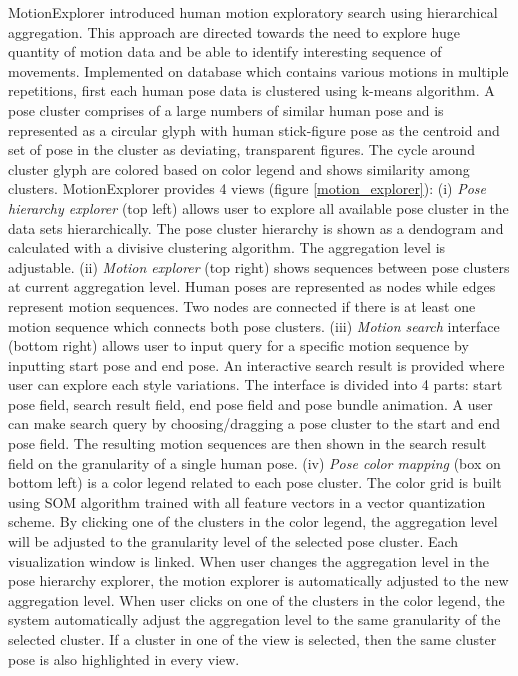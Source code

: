 MotionExplorer\cite{bernard2013} introduced human motion exploratory search using hierarchical aggregation. This approach are directed towards the need to explore huge quantity of motion data and be able to identify interesting sequence of movements. Implemented on database which contains various motions in multiple repetitions, first each human pose data is clustered using k-means algorithm. A pose cluster comprises of a large numbers of similar human pose and is represented as a circular glyph with human stick-figure pose as the centroid and set of pose in the cluster as deviating, transparent figures. The cycle around cluster glyph are colored based on color legend and shows similarity among clusters. MotionExplorer provides 4 views (figure \ref{motion_explorer}): (i) \textit{Pose hierarchy explorer} (top left) allows user to explore all available pose cluster in the data sets hierarchically. The pose cluster hierarchy is shown as a dendogram and calculated with a divisive clustering algorithm. The aggregation level is adjustable. (ii) \textit{Motion explorer} (top right) shows sequences between pose clusters at current aggregation level. Human poses are represented as nodes while edges represent motion sequences. Two nodes are connected if there is at least one motion sequence which connects both pose clusters. (iii) \textit{Motion search} interface (bottom right) allows user to input query for a specific motion sequence by inputting start pose and end pose. An interactive search result is provided where user can explore each style variations. The interface is divided into 4 parts: start pose field, search result field, end pose field and pose bundle animation. A user can make search query by choosing/dragging a pose cluster to the start and end pose field. The resulting motion sequences are then shown in the search result field on the granularity of a single human pose. (iv) \textit{Pose color mapping} (box on bottom left) is a color legend related to each pose cluster. The color grid is built using SOM algorithm trained with all feature vectors in a vector quantization scheme. By clicking one of the clusters in the color legend, the aggregation level will be adjusted to the granularity level of the selected pose cluster. Each visualization window is linked. When user changes the aggregation level in the pose hierarchy explorer, the motion explorer is automatically adjusted to the new aggregation level. When user clicks on one of the clusters in the color legend, the system automatically adjust the aggregation level to the same granularity of the selected cluster. If a cluster in one of the view is selected, then the same cluster pose is also highlighted in every view. 

